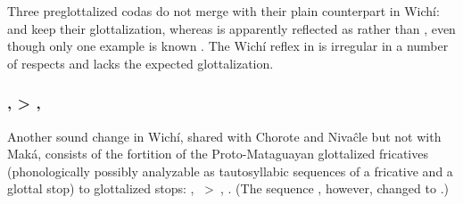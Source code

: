 \begin{exe}
    \ex \brightness \label{wi-deg-brightness}
    \ex \drinkn
    \ex \son
    \ex \yicaay
    \ex \cutdown
    \ex \leech
    \ex \dew
    \ex \jaguar
    \ex \water
    \ex \tail
    \ex \locustcw \label{wi-deg-locustcw}
    \ex \hole
    \ex \answer
    \ex \sweat
    \ex \oldn
    \ex \withstand
    \ex \wash
    \ex \winter
    \ex \yicalhuk
    \ex \powder
    \ex \smelln
    \ex \bitter
    \ex \lippaset
    \ex \fence
    \ex \lid
    \ex \starn
    \ex \vein
    \ex \mesh
    \ex \sprout
    \ex \abdcavity
    \ex \shoot
    \ex \carrysh
    \ex \dig
    \ex \blind
    \ex \uncle
    \ex \duraznillo
    \ex \nest
    \ex \badmood
    \ex \burrow
    \ex \walk
    \ex \climb
    \ex \night
    \ex \headn
    \ex \palosanto
    \ex \sandyplace
    \ex \firewoodhuk
    \ex \earth
\end{exe}

Three preglottalized codas do not merge with their plain counterpart in Wichí:  and  keep their glottalization, whereas  is apparently reflected as  rather than , even though only one example is known . The Wichí reflex in  is irregular in a number of respects and lacks the expected glottalization.

\begin{exe}
    \ex \pronominal
    \ex \grabwork
    \ex \thorncutjan
    \ex {}
    \ex \kingvulture \label{wi-deg-kingvulture}
    \ex \suckb \label{wi-deg-suckb}
    \ex \throwv
    \ex \meat
\end{exe}

\subsubsection{,  > , }\label{wi-glott-fric}

Another sound change in Wichí, shared with Chorote and Nivaĉle but not with Maká, consists of the fortition of the Proto-Mataguayan glottalized fricatives (phonologically possibly analyzable as tautosyllabic sequences of a fricative and a glottal stop) to glottalized stops: , ~>~, . (The sequence , however, changed to .)

\begin{exe}
    \ex \poor
    \ex \femalebreastits
    \ex \skinits
    \ex \meatits
    \ex \juiceits
    \ex \urinateyou
    \ex \urineits
\end{exe}

